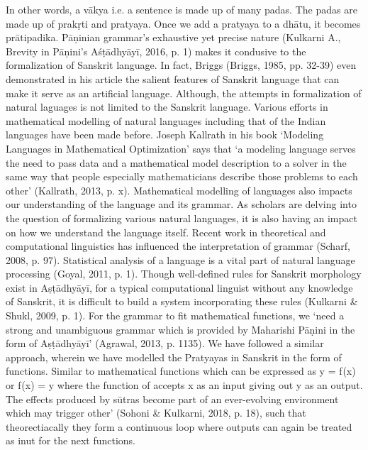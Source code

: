 In other words, a vākya i.e. a sentence is made up of many padas. The padas are made up of prakṛti and pratyaya. Once we add a pratyaya to a dhātu, it becomes prātipadika. 
Pāṇinian grammar’s exhaustive yet precise nature (Kulkarni A., Brevity in Pāṇini’s Aśṭādhyāyī, 2016, p. 1) makes it condusive to the formalization of Sanskrit language. In fact, Briggs (Briggs, 1985, pp. 32-39) even demonstrated in his article the salient features of Sanskrit language that can make it serve as an artificial language. Although, the attempts in formalization of natural laguages is not limited to the Sanskrit language. Various efforts in mathematical modelling of natural languages including that of the Indian languages have been made before. Joseph Kallrath in his book ‘Modeling Languages in Mathematical Optimization’ says that ‘a modeling language serves the need to pass data and a mathematical model description to a solver in the same way that people especially mathematicians describe those problems to each other’ (Kallrath, 2013, p. x). Mathematical modelling of languages also impacts our understanding of the language and its grammar. As scholars are delving into the question of formalizing various natural languages, it is also having an impact on how we understand the language itself. Recent work in theoretical and computational linguistics has influenced the interpretation of grammar (Scharf, 2008, p. 97). Statistical analysis of a language is a vital part of natural language processing (Goyal, 2011, p. 1). Though well-defined rules for Sanskrit morphology exist in Aṣṭādhyāyī, for a typical computational linguist without any knowledge of Sanskrit, it is difficult to build a system incorporating these rules (Kulkarni \& Shukl, 2009, p. 1). For the grammar to fit mathematical functions, we ‘need a strong and unambiguous grammar which is provided by Maharishi Pāṇini in the form of Aṣṭādhyāyī’ (Agrawal, 2013, p. 1135). We have followed a similar approach, wherein we have modelled the Pratyayas in Sanskrit in the form of functions. Similar to mathematical functions which can be expressed as y = f (x) or f (x) = y where the function of accepts x as an input giving out y as an output. The effects produced by sūtras become part of an ever-evolving environment which may trigger other’ (Sohoni \& Kulkarni, 2018, p. 18), such that theorectiacally they form a continuous loop where outputs can again be treated as inut for the next functions. 

